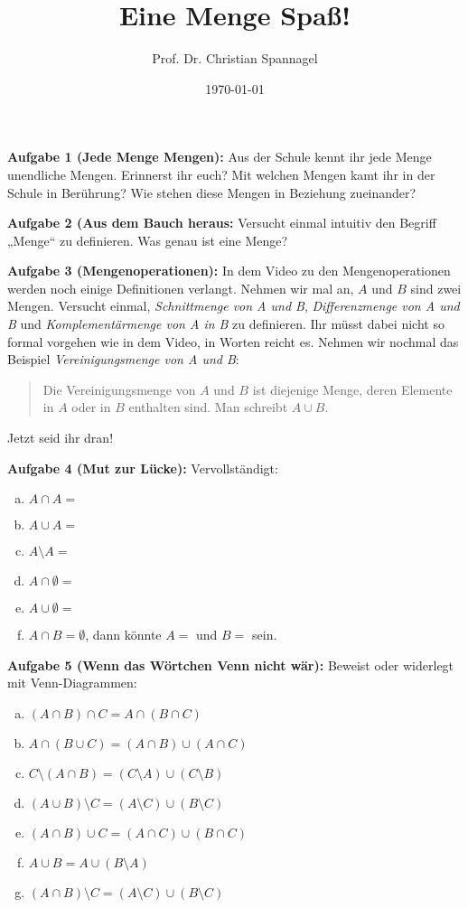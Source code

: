 \documentclass{../cssheet}
\title{Eine Menge Spaß!}
\author{Prof. Dr. Christian Spannagel}
\date{\today}
\begin{document}
\printtitle

\vspace*{10mm}

\textbf{Aufgabe 1 (Jede Menge Mengen):}  Aus der Schule kennt ihr jede Menge unendliche
Mengen. Erinnerst ihr euch? Mit welchen Mengen kamt ihr in der Schule in Berührung? Wie
stehen diese Mengen in Beziehung zueinander?

\textbf{Aufgabe 2 (Aus dem Bauch heraus:} Versucht einmal intuitiv den Begriff „Menge“ zu
definieren. Was genau ist eine Menge?

\textbf{Aufgabe 3 (Mengenoperationen):}  In dem Video zu den Mengenoperationen werden noch
einige Definitionen verlangt. Nehmen wir mal an, $A$ und $B$ sind zwei Mengen. Versucht
einmal, \emph{Schnittmenge von A und B}, \emph{Differenzmenge von A und B} und
\emph{Komplementärmenge von A in B} zu definieren. Ihr müsst dabei nicht so formal vorgehen
wie in dem Video, in Worten reicht es. Nehmen wir nochmal das Beispiel
\emph{Vereinigungsmenge von A und B}:

\begin{quote}
Die Vereinigungsmenge von $A$ und $B$ ist diejenige Menge, deren Elemente in $A$ oder in $B$ enthalten sind. Man schreibt $A \cup B$.
\end{quote}

Jetzt seid ihr dran!
 
\textbf{Aufgabe 4 (Mut zur Lücke):}  
Vervollständigt:

\begin{enumerate}[a)]
\item $A \cap A = $
\item $A \cup A = $
\item $A\setminus A = $
\item $A\cap \emptyset =$
\item $A\cup \emptyset =$
\item $A\cap B = \emptyset$, dann könnte $A=$ \hspace{1cm} und $B=$ \hspace{1cm} sein.
\end{enumerate}

\textbf{Aufgabe 5 (Wenn das Wörtchen Venn nicht wär):}  
Beweist oder widerlegt mit Venn-Diagrammen:
\begin{enumerate}[a)]
\item $(A \cap B) \cap C = A \cap (B \cap C)$
\item $A \cap (B \cup C) = (A \cap B) \cup (A \cap  C)$
\item $C\setminus (A\cap B) = (C\setminus A) \cup (C\setminus B)$
\item $(A\cup B)\setminus C = (A\setminus C) \cup (B\setminus C)$
\item $(A\cap B)\cup C = (A\cap C) \cup (B\cap C)$
\item $A\cup B = A \cup (B\setminus A)$
\item $(A\cap B)\setminus C = (A\setminus C) \cup (B\setminus C)$
\end{enumerate}
\end{document}
